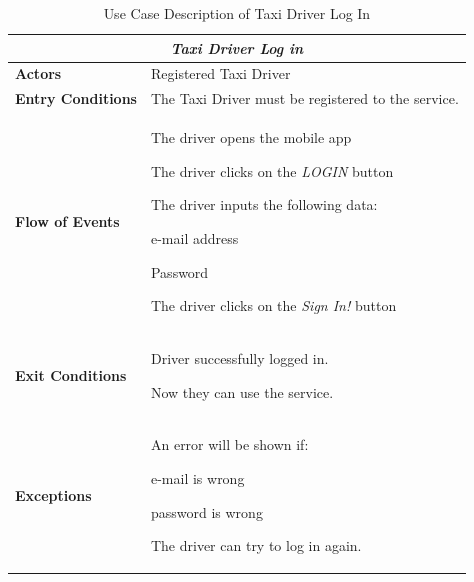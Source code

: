 \documentclass[a4paper]{article}
\begin{document}
\begin{table} [H]
\begin{center}
\begin{tabular}{ |m{}|m{}|  }
\hline
    \multicolumn{2}{|c|}{\textbf{\textit{Taxi Driver Log in}}} \\
\hline \hline
    \textbf{Actors}
&   Registered Taxi Driver
\\ \hline
    \textbf{Entry Conditions}
&   The Taxi Driver must be registered to the service.
\\ \hline
    \textbf{Flow of Events}
& 
    \begin{enumerate*}
    \item The driver opens the mobile app
    \item The driver clicks on the \emph{LOGIN} button
    \item The driver inputs the following data:
        \begin{enumerate*}
        \item e-mail address
        \item Password
        \end{enumerate*}
    \item The driver clicks on the \emph{Sign In!} button
    \end{enumerate*}
\\ \hline
    \textbf{Exit Conditions}
&   Driver successfully logged in.

    Now they can use the service.
\\ \hline
    \textbf{Exceptions}
&   
    An error will be shown if:
    \begin{itemize*}
    \item e-mail is wrong
    \item password is wrong
    \end{itemize*}
    The driver can try to log in again.
\\ \hline
\end{tabular}
\end{center}
\caption{Use Case Description of Taxi Driver Log In}
\label{table:taxilogin}
\end{table}
\end{document}
